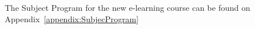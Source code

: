 The Subject Program for the new e-learning course can be found on Appendix~\ref{appendix:SubjecProgram}

%
%
%

